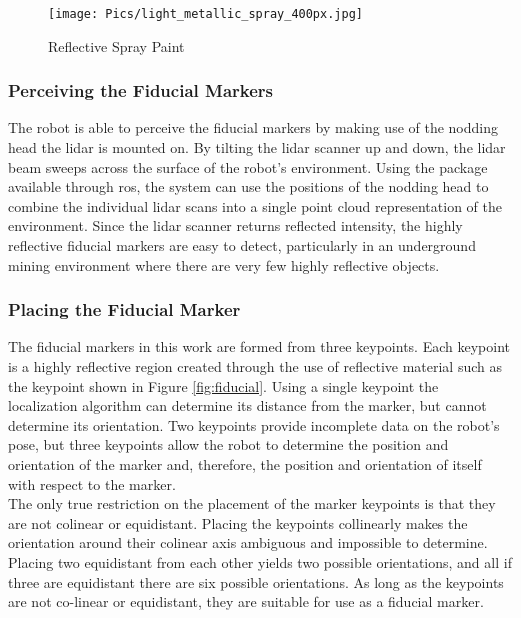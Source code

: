 \begin{figure}
    \centering
    \texttt{[image: Pics/light\_metallic\_spray\_400px.jpg]}
    \caption{Reflective Spray Paint \cite{spraypaint}}
    \label{fig:irspray}
\end{figure}

\subsubsection{Perceiving the Fiducial Markers}

The robot is able to perceive the fiducial markers by making use of the nodding head the \acrshort{lidar} is mounted on. By tilting the \acrshort{lidar} scanner up and down, the \acrshort{lidar} beam sweeps across the surface of the robot's environment. Using the  package available through \acrshort{ros}, the system can use the positions of the nodding head to combine the individual \acrshort{lidar} scans into a single point cloud representation of the environment. Since the \acrshort{lidar} scanner returns reflected intensity, the highly reflective fiducial markers are easy to detect, particularly in an underground mining environment where there are very few highly reflective objects.\\

\subsubsection{Placing the Fiducial Marker}
\label{sec:placing}
The fiducial markers in this work are formed from three keypoints. Each keypoint is a highly reflective region created through the use of reflective material such as the keypoint shown in Figure \ref{fig:fiducial}. Using a single keypoint the localization algorithm can determine its distance from the marker, but cannot determine its orientation. Two keypoints provide incomplete data on the robot's pose, but three keypoints allow the robot to determine the position and orientation of the marker and, therefore, the position and orientation of itself with respect to the marker.\\

The only true restriction on the placement of the marker keypoints is that they are not colinear or equidistant. Placing the keypoints collinearly makes the orientation around their colinear axis ambiguous and impossible to determine. Placing two equidistant from each other yields two possible orientations, and all if three are equidistant there are six possible orientations. As long as the keypoints are not co-linear or equidistant, they are suitable for use as a fiducial marker.\\

